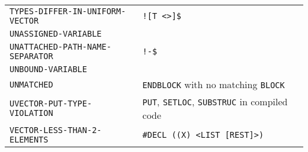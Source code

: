 \documentclass[a4paper,]{article}
\begin{document}
\begin{longtable}[]{@{}ll@{}}
\begin{minipage}[t]{0.58\columnwidth}
\texttt{TYPES-DIFFER-IN-UNIFORM-VECTOR}\strut
\end{minipage} & \begin{minipage}[t]{0.36\columnwidth}\raggedright\strut
\texttt{!{[}T\ \textless{}\textgreater{}{]}\$}\strut
\end{minipage}\tabularnewline
\begin{minipage}[t]{0.58\columnwidth}\raggedright\strut
\texttt{UNASSIGNED-VARIABLE}\strut
\end{minipage} & \begin{minipage}[t]{0.36\columnwidth}\raggedright\strut
\strut
\end{minipage}\tabularnewline
\begin{minipage}[t]{0.58\columnwidth}\raggedright\strut
\texttt{UNATTACHED-PATH-NAME-SEPARATOR}\strut
\end{minipage} & \begin{minipage}[t]{0.36\columnwidth}\raggedright\strut
\texttt{!-\$}\strut
\end{minipage}\tabularnewline
\begin{minipage}[t]{0.58\columnwidth}\raggedright\strut
\texttt{UNBOUND-VARIABLE}\strut
\end{minipage} & \begin{minipage}[t]{0.36\columnwidth}\raggedright\strut
\strut
\end{minipage}\tabularnewline
\begin{minipage}[t]{0.58\columnwidth}\raggedright\strut
\texttt{UNMATCHED}\strut
\end{minipage} & \begin{minipage}[t]{0.36\columnwidth}\raggedright\strut
\texttt{ENDBLOCK} with no matching \texttt{BLOCK}\strut
\end{minipage}\tabularnewline
\begin{minipage}[t]{0.58\columnwidth}\raggedright\strut
\texttt{UVECTOR-PUT-TYPE-VIOLATION}\strut
\end{minipage} & \begin{minipage}[t]{0.36\columnwidth}\raggedright\strut
\texttt{PUT}, \texttt{SETLOC}, \texttt{SUBSTRUC} in compiled code\strut
\end{minipage}\tabularnewline
\begin{minipage}[t]{0.58\columnwidth}\raggedright\strut
\texttt{VECTOR-LESS-THAN-2-ELEMENTS}\strut
\end{minipage} & \begin{minipage}[t]{0.36\columnwidth}\raggedright\strut
\texttt{\#DECL\ ((X)\ \textless{}LIST\ {[}REST{]}\textgreater{})}\strut

\end{minipage}
\end{longtable}
\end{document}
